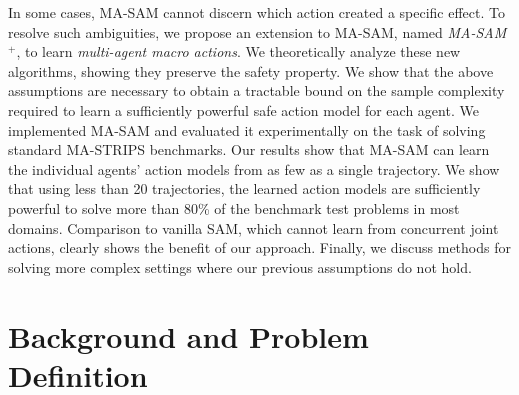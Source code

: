 \documentclass[letterpaper]{article} %
\theoremstyle{definition}
\theoremstyle{remark}
\newcommand{\sam}{\ac{SAM}\xspace}
\newcommand{\masam}{\ac{MA-SAM}\xspace}
\newcommand{\cmasam}{\textit{MA-SAM\ensuremath{^+}}\xspace}
\begin{document}
In some cases, \masam cannot discern which action created a specific effect.
To resolve such ambiguities, we propose an extension to \masam, named \cmasam, to learn \textit{multi-agent macro actions}.
We theoretically analyze these new algorithms, showing they preserve the safety property.
We show that the above assumptions are necessary to obtain a tractable bound on the sample complexity required to learn a sufficiently powerful safe action model for each agent.
We implemented \masam and evaluated it experimentally on the task of solving standard MA-STRIPS benchmarks.
Our results show that \masam can learn the individual agents' action models from as few as a single trajectory.
We show that using less than 20 trajectories, the learned action models are sufficiently powerful to solve more than 80\% of the benchmark test problems in most domains.
Comparison to vanilla \sam, which cannot learn from concurrent joint actions, clearly shows the benefit of our approach.
Finally, we discuss methods for solving more complex settings where our previous assumptions do not hold.


\section{Background and Problem Definition}
\label{sec:background}
\end{document}

